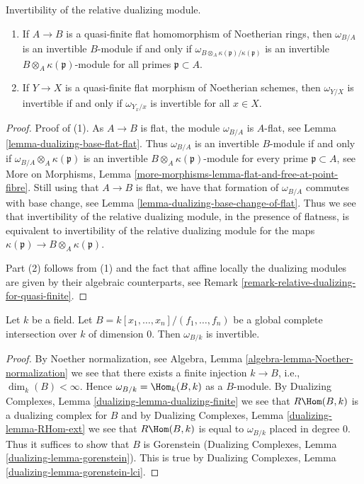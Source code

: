 \begin{lemma}
\label{lemma-characterize-invertible}
Invertibility of the relative dualizing module.
\begin{enumerate}
\item If $A \to B$ is a quasi-finite flat homomorphism of Noetherian rings,
then $\omega_{B/A}$ is an invertible $B$-module if and only if
$\omega_{B \otimes_A \kappa(\mathfrak p)/\kappa(\mathfrak p)}$
is an invertible $B \otimes_A \kappa(\mathfrak p)$-module
for all primes $\mathfrak p \subset A$.
\item If $Y \to X$ is a quasi-finite flat morphism of
Noetherian schemes, then $\omega_{Y/X}$ is invertible
if and only if $\omega_{Y_x/x}$ is invertible for all $x \in X$.
\end{enumerate}
\end{lemma}

\begin{proof}
Proof of (1). As $A \to B$ is flat, the module
$\omega_{B/A}$ is $A$-flat, see Lemma \ref{lemma-dualizing-base-flat-flat}.
Thus $\omega_{B/A}$ is an invertible $B$-module if and only if
$\omega_{B/A} \otimes_A \kappa(\mathfrak p)$
is an invertible $B \otimes_A \kappa(\mathfrak p)$-module for
every prime $\mathfrak p \subset A$, see More on Morphisms, Lemma
\ref{more-morphisms-lemma-flat-and-free-at-point-fibre}.
Still using that $A \to B$ is flat, we have that
formation of $\omega_{B/A}$ commutes with base change, see
Lemma \ref{lemma-dualizing-base-change-of-flat}.
Thus we see that invertibility of the relative dualizing module,
in the presence of flatness, is equivalent to invertibility
of the relative dualizing module for the maps
$\kappa(\mathfrak p) \to B \otimes_A \kappa(\mathfrak p)$.

\medskip\noindent
Part (2) follows from (1) and the fact that affine locally
the dualizing modules are given by their algebraic counterparts, see
Remark \ref{remark-relative-dualizing-for-quasi-finite}.
\end{proof}

\begin{lemma}
\label{lemma-dim-zero-global-complete-intersection-over-field}
Let $k$ be a field. Let $B = k[x_1, \ldots, x_n]/(f_1, \ldots, f_n)$
be a global complete intersection over $k$ of dimension $0$.
Then $\omega_{B/k}$ is invertible.
\end{lemma}

\begin{proof}
By Noether normalization, see
Algebra, Lemma \ref{algebra-lemma-Noether-normalization}
we see that there exists a finite injection $k \to B$, i.e.,
$\dim_k(B) < \infty$. Hence $\omega_{B/k} = \Hom_k(B, k)$
as a $B$-module.
By Dualizing Complexes, Lemma \ref{dualizing-lemma-dualizing-finite}
we see that $R\Hom(B, k)$ is a dualizing complex for $B$
and by Dualizing Complexes, Lemma \ref{dualizing-lemma-RHom-ext}
we see that $R\Hom(B, k)$ is equal to $\omega_{B/k}$
placed in degree $0$. Thus it suffices to show that
$B$ is Gorenstein
(Dualizing Complexes, Lemma \ref{dualizing-lemma-gorenstein}).
This is true by Dualizing Complexes, Lemma
\ref{dualizing-lemma-gorenstein-lci}.
\end{proof}

